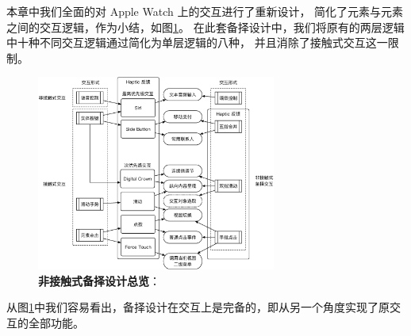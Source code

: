 本章中我们全面的对 Apple Watch 上的交互进行了重新设计，
简化了元素与元素之间的交互逻辑，作为小结，如图\ref{fig:interaction}。
在此套备择设计中，我们将原有的两层逻辑中十种不同交互逻辑通过简化为单层逻辑的八种，
并且消除了接触式交互这一限制。

\begin{figure}[H]
    \kaishu
    \centering
    \includegraphics[width=0.7\textwidth]{figures/interaction}
    \caption{\kaishu \textbf{非接触式备择设计总览}：}
    \label{fig:interaction}
\end{figure}

从图\ref{fig:interaction}中我们容易看出，备择设计在交互上是完备的，即从另一个角度实现了原交互的全部功能。
